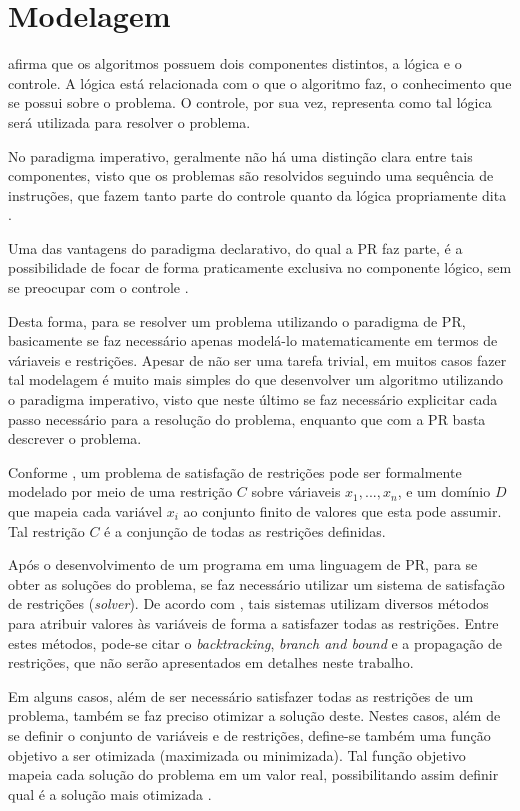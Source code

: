 \section{Modelagem} \label{sc-modelagem}

\cite{kowalski} afirma que os algoritmos possuem dois componentes distintos, a lógica e o controle. A lógica está relacionada com o que o algoritmo faz, o conhecimento que se possui sobre o problema. O controle, por sua vez, representa como tal lógica será utilizada para resolver o problema.

No paradigma imperativo, geralmente não há uma distinção clara entre tais componentes, visto que os problemas são resolvidos seguindo uma sequência de instruções, que fazem tanto parte do controle quanto da lógica propriamente dita \cite{thom}.

Uma das vantagens do paradigma declarativo, do qual a PR faz parte, é a possibilidade de focar de forma praticamente exclusiva no componente lógico, sem se preocupar com o controle \cite{thom}.

Desta forma, para se resolver um problema utilizando o paradigma de PR, basicamente se faz necessário apenas modelá-lo matematicamente em termos de váriaveis e restrições. Apesar de não ser uma tarefa trivial, em muitos casos fazer tal modelagem é muito mais simples do que desenvolver um algoritmo utilizando o paradigma imperativo, visto que neste último se faz necessário explicitar cada passo necessário para a resolução do problema, enquanto que com a PR basta descrever o problema.

Conforme \cite{stuckey}, um problema de satisfação de restrições pode ser formalmente modelado por meio de uma restrição $C$ sobre váriaveis $x_1, ..., x_n$, e um domínio $D$ que mapeia cada variável $x_i$ ao conjunto finito de valores que esta pode assumir. Tal restrição $C$ é a conjunção de todas as restrições definidas.

Após o desenvolvimento de um programa em uma linguagem de PR, para se obter as soluções do problema, se faz necessário utilizar um sistema de satisfação de restrições (\textit{solver}). De acordo com \cite{cphandbook}, tais sistemas utilizam diversos métodos para atribuir valores às variáveis de forma a satisfazer todas as restrições. Entre estes métodos, pode-se citar o \textit{backtracking}, \textit{branch and bound} e a propagação de restrições, que não serão apresentados em detalhes neste trabalho.

Em alguns casos, além de ser necessário satisfazer todas as restrições de um problema, também se faz preciso otimizar a solução deste. Nestes casos, além de se definir o conjunto de variáveis e de restrições, define-se também uma função objetivo a ser otimizada (maximizada ou minimizada). Tal função objetivo mapeia cada solução do problema em um valor real, possibilitando assim definir qual é a solução mais otimizada \cite{apt}.

